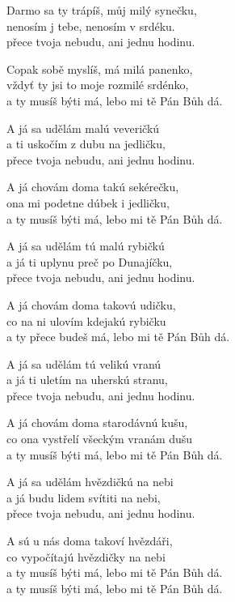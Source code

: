 
\ve{}
Darmo sa ty trápíš, můj milý synečku,\\
nenosím j tebe, nenosím v srdéku.\\
přece tvoja nebudu, ani jednu hodinu.

\ve{}
Copak sobě myslíš, má milá panenko,\\
vždyť ty jsi to moje rozmilé srdénko,\\
a ty musíš býti má, lebo mi tě Pán Bůh dá.

\ve{}
A já sa udělám malú veveričkú\\
a ti uskočím z dubu na jedličku,\\
přece tvoja nebudu, ani jednu hodinu.

\ve{}
A já chovám doma takú sekérečku,\\
ona mi podetne dúbek i jedličku,\\
a ty musíš býti má, lebo mi tě Pán Bůh dá.

\ve{}
A já sa udělám tú malú rybičkú\\
a já ti uplynu preč po Dunajíčku,\\
přece tvoja nebudu, ani jednu hodinu.

\ve{}
A já chovám doma takovú udičku,\\
co na ni ulovím kdejakú rybičku\\
a ty přece budeš má, lebo mi tě Pán Bůh dá.

\ve{}
A já sa udělám tú velikú vranú\\
a já ti uletím na uherskú stranu,\\
přece tvoja nebudu, ani jednu hodinu.

\ve{}
A já chovám doma starodávnú kušu,\\
co ona vystřelí všeckým vranám dušu\\
a ty musíš býti má, lebo mi tě Pán Bůh dá.

\ve{}
A já sa udělám hvězdičkú na nebi\\
a já budu lidem svítiti na nebi,\\
přece tvoja nebudu, ani jednu hodinu.

\ve{}
A sú u nás doma takoví hvězdáři,\\
co vypočítajú hvězdičky na nebi\\
a ty musíš býti má, lebo mi tě Pán Bůh dá.\\
a ty musíš býti má, lebo mi tě Pán Bůh dá.

\esong{}